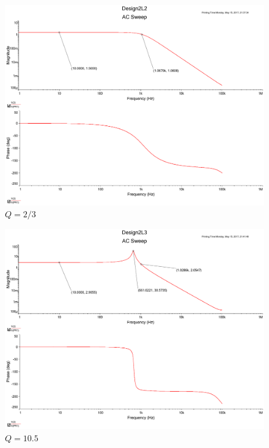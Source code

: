 \documentclass[UTF8,a4paper]{paper}
\begin{document}
\begin{figure}
\centering
\includegraphics[width=\textwidth]{2L2_3.pdf}
\caption{$Q=2/3$}
\label{LQ23}
\end{figure}
\begin{figure}
\centering
\includegraphics[width=\textwidth]{2L10_5.pdf}
\caption{$Q=10.5$}
\label{LQ10}
\end{figure}
\clearpage
\end{document}
